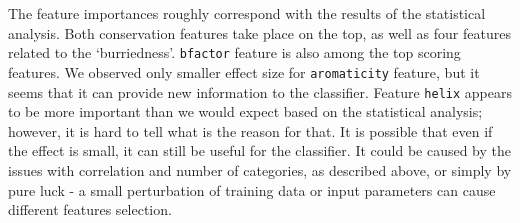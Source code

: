 The feature importances roughly correspond with the results of the statistical analysis. Both conservation features take place on the top, as well as four features related to the `burriedness'. \texttt{bfactor} feature is also among the top scoring features. We observed only smaller effect size for \texttt{aromaticity} feature, but it seems that it can provide new information to the classifier. Feature \texttt{helix} appears to be more important than we would expect based on the statistical analysis; however, it is hard to tell what is the reason for that. It is possible that even if the effect is small, it can still be useful for the classifier. It could be caused by the issues with correlation and number of categories, as described above, or simply by pure luck - a small perturbation of training data or input parameters can cause different features selection.

